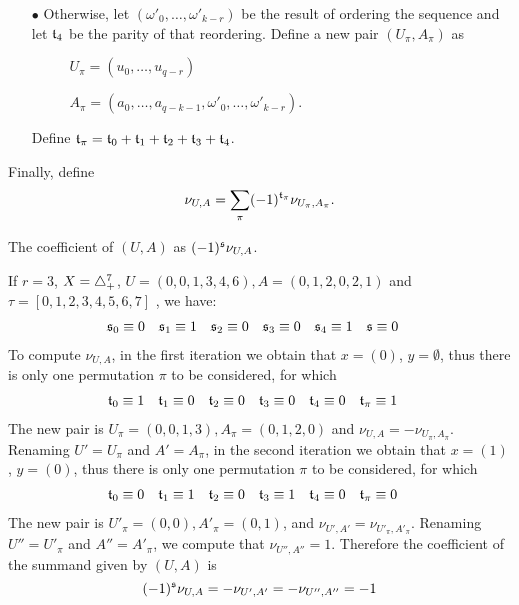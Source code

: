 \begin{itemize}
\begin{itemize}
\begin{itemize}
	\item[$\bullet$] Otherwise, let $(\omega'_0,\ldots,\omega'_{k-r})$ be the result of ordering the sequence and let $\mathfrak{t}_4$ be the parity of that reordering. Define a new pair $(U_{\pi},A_{\pi})$ as
	\begin{itemize}
		\item[] $\quad U_{\pi} = (u_0,\ldots,u_{q-r})$
		\item[] $\quad A_{\pi} = (a_0,\ldots,a_{q-k-1},\omega'_0,\ldots,\omega'_{k-r})$.
	\end{itemize}
Define $\mathfrak{t}_\pi = \mathfrak{t}_0+\mathfrak{t}_1+\mathfrak{t}_2+\mathfrak{t}_3+\mathfrak{t}_4$.
\end{itemize}
Finally, define
\[
	\nu_{U,A} = \sum_{\pi}(-1)^{\mathfrak{t}_\pi}\nu_{U_\pi,A_\pi}.
\]
\end{itemize}
\end{itemize}
The coefficient of $(U,A)$ as $(-1)^{\mathfrak{s}}\nu_{U,A}$.

\begin{example}\label{example:formulas1_3}
	If $r=3$, $X= \triangle_{+}^7$, $U = (0,0,1,3,4,6), A = (0,1,2,0,2,1)$ and $\tau = [0,1,2,3,4,5,6,7]$ , we have:
	\begin{align*}
		\mathfrak{s}_0 &\equiv 0
		&
		\mathfrak{s}_1 &\equiv 1
		&
		\mathfrak{s}_2 &\equiv 0
		&
		\mathfrak{s}_3 &\equiv 0
		&
		\mathfrak{s}_4 &\equiv 1
		&
		\mathfrak{s} &\equiv 0
	\end{align*}
	To compute $\nu_{U,A}$, in the first iteration we obtain that $x=(0)$, $y=\emptyset$, thus there is only one permutation $\pi$ to be considered, for which
	\begin{align*}
		\mathfrak{t}_0 &\equiv 1
		&
		\mathfrak{t}_1 &\equiv 0
		&
		\mathfrak{t}_2 &\equiv 0
		&
		\mathfrak{t}_3 &\equiv 0
		&
		\mathfrak{t}_4 &\equiv 0
		&
		\mathfrak{t}_{\pi} &\equiv 1
	\end{align*}
	The new pair is $U_{\pi} = (0,0,1,3), A_\pi = (0,1,2,0)$ and $\nu_{U,A} = -\nu_{U_\pi,A_\pi}$. Renaming $U'= U_\pi$ and $A'=A_\pi$, in the second iteration we obtain that $x=(1)$, $y=(0)$, thus there is only one permutation $\pi$ to be considered, for which
	\begin{align*}
		\mathfrak{t}_0 &\equiv 0
		&
		\mathfrak{t}_1 &\equiv 1
		&
		\mathfrak{t}_2 &\equiv 0
		&
		\mathfrak{t}_3 &\equiv 1
		&
		\mathfrak{t}_4 &\equiv 0
		&
		\mathfrak{t}_{\pi} &\equiv 0
	\end{align*}
	The new pair is $U'_{\pi} = (0,0), A'_\pi = (0,1)$, and $\nu_{U',A'} = \nu_{U'_\pi,A'_\pi}$. Renaming $U'' = U'_\pi$ and $A'' = A'_\pi$, we compute that $\nu_{U'',A''} = 1$. Therefore the coefficient of the summand given by $(U,A)$ is
	\[
		(-1)^{\mathfrak{s}} \nu_{U,A} = -\nu_{U',A'} = -\nu_{U'',A''} = -1
	\]
\end{example}

